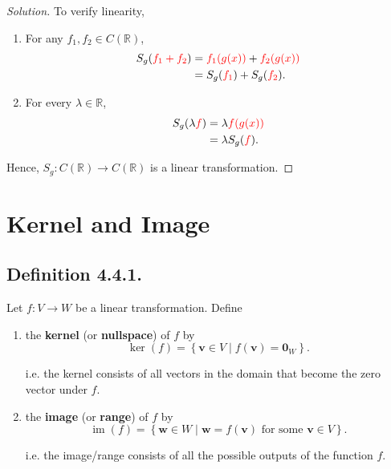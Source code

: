 \documentclass[12pt]{article}
\newenvironment{solution}
{\begin{proof}[Solution]}
{\end{proof}}
\begin{document}
\begin{solution}

To verify linearity,

\begin{enumerate}
    \item For any $f_1,f_2\in C(\mathbb{R})$,
    \[
    \begin{aligned}
    S_g(\textcolor{red}{f_1+f_2})
    &= \textcolor{red}{f_1(g(x))}+\textcolor{red}{f_2(g(x))}\\
    &= S_g(\textcolor{red}{f_1})+S_g(\textcolor{red}{f_2}).
    \end{aligned}
    \]

    \item For every $\lambda\in\mathbb{R}$,
    \[
    \begin{aligned}
    S_g(\lambda \textcolor{red}{f})
    &= \lambda \textcolor{red}{f(g(x))}\\
    &= \lambda S_g(\textcolor{red}{f}).
    \end{aligned}
    \]
\end{enumerate}

Hence, $S_g:C(\mathbb{R})\rightarrow C(\mathbb{R})$ is a linear transformation.

\end{solution}

\section{Kernel and Image}

\subsection{Definition 4.4.1.}
Let $f:V\rightarrow W$ be a linear transformation. Define
\begin{enumerate}
    \item the \textbf{kernel} (or \textbf{nullspace}) of $f$ by
    \[
    \operatorname{ker}(f)
    =
    \left\{
    \mathbf{v}\in V
    \mid
    f(\mathbf{v})=\mathbf{0}_W
    \right\}.
    \]

    i.e. the kernel consists of all vectors in the domain that become the zero vector under $f$.

    \item the \textbf{image} (or \textbf{range}) of $f$ by
    \[
    \operatorname{im}(f)
    =
    \left\{
    \mathbf{w}\in W
    \mid
    \mathbf{w}=f(\mathbf{v})
    \text{ for some }
    \mathbf{v}\in V
    \right\}.
    \]

    i.e. the image/range consists of all the possible outputs of the function $f$.
\end{enumerate}
\end{document}
